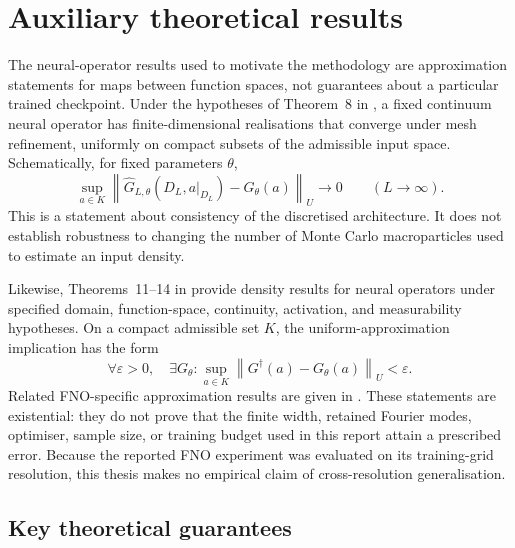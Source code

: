 \documentclass[11pt,a4paper]{article}
\providecommand{\norm}[1]{\left\lVert#1\right\rVert}
\begin{document}
\begin{sloppypar}
\newpage
\appendix



\section{Auxiliary theoretical results}


The neural-operator results used to motivate the methodology are approximation statements for maps between function spaces, not guarantees about a particular trained checkpoint. Under the hypotheses of Theorem~8 in \cite{kovachki_neural_2023}, a fixed continuum neural operator has finite-dimensional realisations that converge under mesh refinement, uniformly on compact subsets of the admissible input space. Schematically, for fixed parameters \(\theta\),
\begin{equation}
    \sup_{a\in K}
    \norm{
        \widehat{G}_{L,\theta}(D_L,a|_{D_L})-G_{\theta}(a)
    }_{U}
    \longrightarrow 0
    \qquad (L\to\infty).
    \label{eq:app_discretisation}
\end{equation}
This is a statement about consistency of the discretised architecture. It does not establish robustness to changing the number of Monte Carlo macroparticles used to estimate an input density.

Likewise, Theorems~11--14 in \cite{kovachki_neural_2023} provide density results for neural operators under specified domain, function-space, continuity, activation, and measurability hypotheses. On a compact admissible set \(K\), the uniform-approximation implication has the form
\begin{equation}
    \forall\varepsilon>0,\quad
    \exists G_{\theta}:
    \sup_{a\in K}
    \norm{G^{\dagger}(a)-G_{\theta}(a)}_{U}
    <\varepsilon.
    \label{eq:app_operator_approximation}
\end{equation}
Related FNO-specific approximation results are given in \cite{kovachki_universal_2021}. These statements are existential: they do not prove that the finite width, retained Fourier modes, optimiser, sample size, or training budget used in this report attain a prescribed error. Because the reported FNO experiment was evaluated on its training-grid resolution, this thesis makes no empirical claim of cross-resolution generalisation.

\subsection{Key theoretical guarantees}
\label{subsec:key-theorems}


\end{sloppypar}
\end{document}
